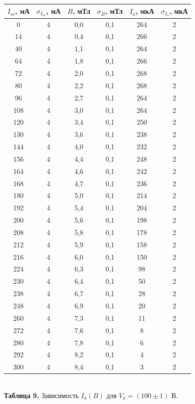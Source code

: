 \documentclass[a4paper, 12pt]{article}%
\begin{document}
\begin{center}
\begin{tabular}{|c|c|c|c|c|c|}
\hline
$I_m$, мА & $\sigma_{I_m}$, мА & $B$, мТл & $\sigma_B$, мТл & $I_a$, мкА & $\sigma_{I_a}$, мкА \\ \hline
0 & 4 & 0,0 & 0,1 & 264 & 2 \\ \hline
14 & 4 & 0,4 & 0,1 & 266 & 2 \\ \hline
40 & 4 & 1,1 & 0,1 & 264 & 2 \\ \hline
64 & 4 & 1,8 & 0,1 & 266 & 2 \\ \hline
72 & 4 & 2,0 & 0,1 & 268 & 2 \\ \hline
80 & 4 & 2,2 & 0,1 & 268 & 2 \\ \hline
96 & 4 & 2,7 & 0,1 & 264 & 2\\ \hline
108 & 4 & 3,0 & 0,1 & 264 & 2 \\ \hline
120 & 4 & 3,4 & 0,1 & 250 & 2 \\ \hline
130 & 4 & 3,6 & 0,1 & 238 & 2 \\ \hline
144 & 4 & 4,0 & 0,1 & 232 & 2 \\ \hline
156 & 4 & 4,4 & 0,1 & 248 & 2 \\ \hline
164 & 4 & 4,6 & 0,1 & 242 & 2 \\ \hline
168 & 4 & 4,7 & 0,1 & 236 & 2 \\ \hline
180 & 4 & 5,0 & 0,1 & 214 & 2 \\ \hline
192 & 4 & 5,4 & 0,1 & 204 & 2 \\ \hline
200 & 4 & 5,6 & 0,1 & 198 & 2 \\ \hline
208 & 4 & 5,8 & 0,1 & 178 & 2 \\ \hline
212 & 4 & 5,9 & 0,1 & 158 & 2 \\ \hline
216 & 4 & 6,0 & 0,1 & 150 & 2 \\ \hline
224 & 4 & 6,3 & 0,1 & 98 & 2 \\ \hline
230 & 4 & 6,4 & 0,1 & 50 & 2 \\ \hline
238 & 4 & 6,7 & 0,1 & 28 & 2 \\ \hline
248 & 4 & 6,9 & 0,1 & 20 & 2 \\ \hline
260 & 4 & 7,3 & 0,1 & 11 & 2 \\ \hline
272 & 4 & 7,6 & 0,1 & 8 & 2 \\ \hline
280 & 4 & 7,8 & 0,1 & 6 & 2 \\ \hline
292 & 4 & 8,2 & 0,1 & 4 & 2 \\ \hline
300 & 4 & 8,4 & 0,1 & 3 & 2 \\ \hline
\end{tabular}\\
\textbf{Таблица 9.} Зависимость $I_a(B)$ для $V_a = (100 \pm 1)$ В.
\end{center}
\end{document}
